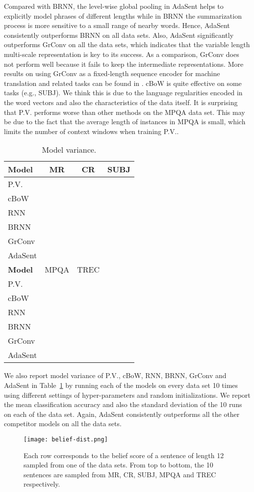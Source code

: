 \documentclass{article}
\theoremstyle{definition}
\begin{document}
Compared with BRNN, the level-wise global pooling in AdaSent helps to explicitly model phrases of different lengths while in BRNN the summarization process is more sensitive to a small range of nearby words.  Hence, AdaSent consistently outperforms BRNN on all data sets. Also, AdaSent significantly outperforms GrConv on all the data sets, which indicates that the variable length multi-scale representation is key to its success. As a comparison, GrConv does not perform well because it fails to keep the intermediate representations. More results on using GrConv as a fixed-length sequence encoder for machine translation and related tasks can be found in \cite{cho2014properties}. cBoW is quite effective on some tasks (e.g., SUBJ). We think this is due to the language regularities encoded in the word vectors and also the characteristics of the data itself. It is surprising that P.V. performs worse than other methods on the MPQA data set. This may be due to the fact that the average length of instances in MPQA is small, which limits the number of context windows when training P.V..
\begin{table}[htb]
\small
\centering
\begin{tabular}{l||c|c|c}\hline
\textbf{Model} & MR & CR & SUBJ \\\hline
P.V. &  &  &  \\\hline
cBoW &  &  &  \\
RNN &  &  &   \\
BRNN &  &  &  \\
GrConv &  &  &  \\\hline
AdaSent &  &  &  \\\hline\hline
\textbf{Model} & MPQA & TREC \\\hline
P.V. &  &  & \\\hline
cBoW &  &  & \\
RNN &  &  & \\
BRNN &  &  & \\
GrConv &  & \\\hline
AdaSent &  &  & \\\hline
\end{tabular}
\caption{Model variance.}
\label{table:robustness}
\end{table}

We also report model variance of P.V., cBoW, RNN, BRNN, GrConv and AdaSent in Table~\ref{table:robustness} by running each of the models on every data set 10 times using different settings of hyper-parameters and random initializations. We report the mean classification accuracy and also the standard deviation of the 10 runs on each of the data set. Again, AdaSent consistently outperforms all the other competitor models on all the data sets.
\begin{figure}[htb]
\centering
	\texttt{[image: belief-dist.png]}
\caption{Each row corresponds to the belief score of a sentence of length 12 sampled from one of the data sets.  From top to bottom, the 10 sentences are sampled from MR, CR, SUBJ, MPQA and TREC respectively.}
\label{fig:belief}
\end{figure}
\end{document}
